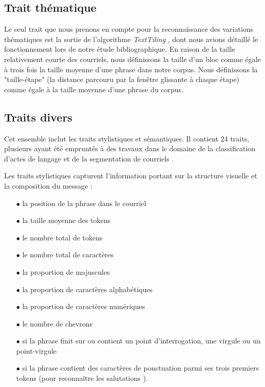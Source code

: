 \subsection{Trait thématique}

Le seul trait que nous prenons en compte pour la reconnaissance des variations thématiques est la sortie de l'algorithme \textit{TextTiling} \cite{hearst1997texttiling}, dont nous avions détaillé le fonctionnement lors de notre étude bibliographique. En raison de la taille relativement courte des courriels, nous définissons la taille d'un bloc comme égale à trois fois la taille moyenne d'une phrase dans notre corpus. Nous définissons la "taille-étape" (la distance parcouru par la fenêtre glissante à chaque étape) comme égale à la taille moyenne d'une phrase du corpus.

\subsection{Traits divers}

Cet ensemble inclut les traits stylistiques et sémantiques. Il contient 24 traits, plusieurs ayant été empruntés à des travaux dans le domaine de la classification d'actes de langage \cite{qadir2011classifying} et de la segmentation de courriels \cite{lampert2009segmenting}. 

Les traits stylistiques capturent l'information portant sur la structure visuelle et la composition du message : 

\begin{itemize}
	\item[$\bullet$] la position de la phrase dans le courriel
	\item[$\bullet$] la taille moyenne des tokens
	\item[$\bullet$] le nombre total de tokens 
	\item[$\bullet$] le nombre total de caractères
	\item[$\bullet$] la proportion de majuscules
	\item[$\bullet$] la proportion de caractères alphabétiques
	\item[$\bullet$] la proportion de caractères numériques
	\item[$\bullet$] le nombre de chevrons
	\item[$\bullet$] si la phrase finit sur ou contient un point d'interrogation, une virgule ou un point-virgule
	\item[$\bullet$] si la phrase contient des caractères de ponctuation parmi ses trois premiers tokens (pour reconnaître les salutations \cite{qadir2011classifying}).
\end{itemize}


